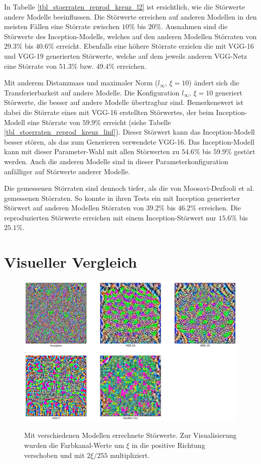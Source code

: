 \documentclass{FFHS_Thesis_Additions/ffhsthesis}
\begin{document}
In Tabelle \ref{tbl_stoerraten_reprod_kreuz_l2} ist ersichtlich, wie die Störwerte andere Modelle beeinflussen. 
Die Störwerte erreichen auf anderen Modellen in den meisten Fällen eine Störrate zwischen $10\%$ bis $20\%$. 
Ausnahmen sind die Störwerte des Inception-Modells, welches auf den anderen Modellen Störraten von $29.3\%$ bis $40.6\%$ erreicht. 
Ebenfalls eine höhere Störrate erzielen die mit VGG-16 und VGG-19 generierten Störwerte, welche auf dem jeweils anderen VGG-Netz eine Störrate von $51.3\%$ bzw. $49.4\%$ erreichen.

Mit anderem Distanzmass und maximaler Norm ($l_\infty$, $\xi=10$) ändert sich die Transferierbarkeit auf andere Modelle. 
Die Konfiguration $l_\infty$, $\xi=10$ generiert Störwerte, die besser auf andere Modelle übertragbar sind. 
Bemerkenswert ist dabei die Störrate eines mit VGG-16 erstellten Störwertes, der beim Inception-Modell eine Störrate von $59.9\%$ erreicht (siehe Tabelle \ref{tbl_stoerraten_reprod_kreuz_linf}). 
Dieser Störwert kann das Inception-Modell besser stören, als das zum Generieren verwendete VGG-16. 
Das Inception-Modell kann mit dieser Parameter-Wahl mit allen Störwerten zu $54.6\%$ bis $59.9\%$ gestört werden. 
Auch die anderen Modelle sind in dieser Parameterkonfiguration anfälliger auf Störwerte anderer Modelle. 

Die gemessenen Störraten sind dennoch tiefer, als die von Moosavi-Dezfooli et al. gemessenen Störraten. 
So konnte in ihren Tests ein mit Inception generierter Störwert auf anderen Modellen Störraten von $39.2\%$ bis $46.2\%$ erreichen. 
Die reproduzierten Störwerte erreichen mit einem Inception-Störwert nur $15.6\%$ bis $25.1\%$.

\section{Visueller Vergleich}


\begin{figure}[h]

\caption{Mit verschiedenen Modellen errechnete Störwerte. Zur Visualisierung wurden die Farbkanal-Werte um $\xi$ in die positive Richtung verschoben und mit $2\xi / 255$ multipliziert.}
\centering
\includegraphics[width=\textwidth]{./images/own_perturbations.png}
\label{fig_stoerwerte}
\end{figure}
\end{document}

